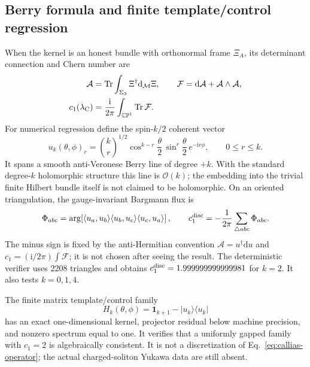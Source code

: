 \documentclass[11pt]{article}
\theoremstyle{definition}
\theoremstyle{remark}
\newcommand{\ii}{\mathrm i}
\newcommand{\dd}{\mathrm d}
\newcommand{\CP}{\mathbb {CP}}
\newcommand{\cO}{\mathcal O}
\newcommand{\cM}{\mathcal M}
\newcommand{\Tr}{\operatorname{Tr}}
\begin{document}
\subsection{Berry formula and finite template/control regression}

When the kernel is an honest bundle with orthonormal frame \(\Xi_A\), its
determinant connection and Chern number are
\begin{align}
 \mathcal A&=\Tr\int_{\Sigma_3}\Xi^\dagger\dd_{\cM}\Xi,
 \qquad \mathcal F=\dd\mathcal A+\mathcal A\wedge\mathcal A,
 \label{eq:kernel-berry}\\
 c_1(\lambda_{\rm C})
 &=\frac{\ii}{2\pi}\int_{\CP^1}\Tr\mathcal F.
 \label{eq:berry-chern}
\end{align}
For numerical regression define the spin-\(k/2\) coherent vector
\begin{equation}
 u_k(\theta,\phi)_r
 =\binom{k}{r}^{1/2}
 \cos^{k-r}\frac\theta2\,
 \sin^r\frac\theta2\,e^{-\ii r\phi},
 \qquad 0\le r\le k.
 \label{eq:coherent-vector}
\end{equation}
It spans a smooth anti-Veronese Berry line of degree \(+k\).  With the
standard degree-\(k\) holomorphic structure this line is \(\cO(k)\); the
embedding into the trivial finite Hilbert bundle itself is not claimed to be
holomorphic.  On an oriented triangulation, the gauge-invariant Bargmann flux is
\begin{equation}
 \Phi_{abc}
 =\arg\!\left[
 \langle u_a,u_b\rangle
 \langle u_b,u_c\rangle
 \langle u_c,u_a\rangle\right],
 \qquad
 c_1^{\rm disc}=-\frac1{2\pi}\sum_{\triangle abc}\Phi_{abc}.
 \label{eq:discrete-chern}
\end{equation}
The minus sign is fixed by the anti-Hermitian convention
\(\mathcal A=u^\dagger\dd u\) and
\(c_1=(\ii/2\pi)\int\mathcal F\); it is not chosen after seeing the result.
The deterministic verifier uses 2208 triangles and obtains
\(c_1^{\rm disc}=1.999999999999981\) for \(k=2\).  It also tests
\(k=0,1,4\).

The finite matrix template/control family
\begin{equation}
 H_k(\theta,\phi)=\bm1_{k+1}-|u_k\rangle\langle u_k|
 \label{eq:finite-family}
\end{equation}
has an exact one-dimensional kernel, projector residual below machine
precision, and nonzero spectrum equal to one.  It verifies that a uniformly
gapped family with \(c_1=2\) is algebraically consistent.  It is not a
discretization of Eq.~\eqref{eq:callias-operator}; the actual charged-soliton
Yukawa data are still absent.
\end{document}
